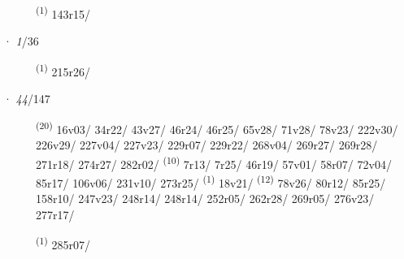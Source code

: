 \begin{description}
    \item[]  \textsuperscript{(1)} \mbox{143r15/}
\end{description}
\ENTRYEND
\noindent{} · \textit{1}/36 \LEMMALINE
\begin{description}
    \item[]  \textsuperscript{(1)} \mbox{215r26/}
\end{description}
\ENTRYEND
\noindent{} · \textit{44}/147 \LEMMALINE
\begin{description}
    \item[]  \textsuperscript{(20)} \mbox{16v03/} \mbox{34r22/} \mbox{43v27/} \mbox{46r24/} \mbox{46r25/} \mbox{65v28/} \mbox{71v28/} \mbox{78v23/} \mbox{222v30/} \mbox{226v29/} \mbox{227v04/} \mbox{227v23/} \mbox{229r07/} \mbox{229r22/} \mbox{268v04/} \mbox{269r27/} \mbox{269r28/} \mbox{271r18/} \mbox{274r27/} \mbox{282r02/} \CASEBREAK {} \textsuperscript{(10)} \mbox{7r13/} \mbox{7r25/} \mbox{46r19/} \mbox{57v01/} \mbox{58r07/} \mbox{72v04/} \mbox{85r17/} \mbox{106v06/} \mbox{231v10/} \mbox{273r25/} \CASEBREAK {} \textsuperscript{(1)} \mbox{18v21/} \textsuperscript{(12)} \mbox{78v26/} \mbox{80r12/} \mbox{85r25/} \mbox{158r10/} \mbox{247v23/} \mbox{248r14/} \mbox{248r14/} \mbox{252r05/} \mbox{262r28/} \mbox{269r05/} \mbox{276v23/} \mbox{277r17/}
    \item[]  \textsuperscript{(1)} \mbox{285r07/}
\end{description}
\ENTRYEND

